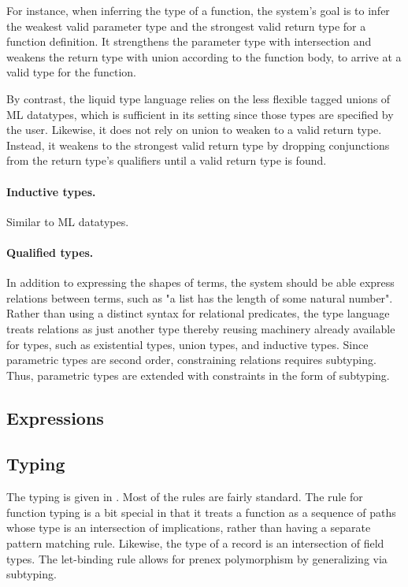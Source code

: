 \documentclass[sigplan,screen,review]{acmart}
\begin{document}
For instance, when inferring the type of a function, 
the system's goal is to infer the weakest valid parameter type and the strongest valid return type for a function definition.
It strengthens the parameter type with intersection and weakens the return type with union according to the function body,
to arrive at a valid type for the function.  

By contrast, the liquid type language relies on the less flexible tagged unions of ML datatypes, 
which is sufficient in its setting since those types are specified by the user. 
Likewise, it does not rely on union to weaken to a valid return type. 
Instead, it weakens to the strongest valid return type by dropping conjunctions from 
the return type's qualifiers until a valid return type is found.

\paragraph{Inductive types.} Similar to ML datatypes.

\paragraph{Qualified types.}
In addition to expressing the shapes of terms, the system should be able express relations between terms,
such as "a list has the length of some natural number".
Rather than using a distinct syntax for relational predicates, 
the type language treats relations as just another type thereby reusing machinery already 
available for types, such as existential types, union types, and inductive types.
Since parametric types are second order, constraining relations requires subtyping.
Thus, parametric types are extended with constraints in the form of subtyping.


\subsection{Expressions}

\subsection{Typing}
The typing is given in .
Most of the rules are fairly standard. 
The rule for function typing is a bit special in that
it treats a function as a sequence of paths whose type is an intersection of implications,
rather than having a separate pattern matching rule. 
Likewise, the type of a record is an intersection of field types.
The let-binding rule allows for prenex polymorphism by generalizing via subtyping. 
\end{document}
